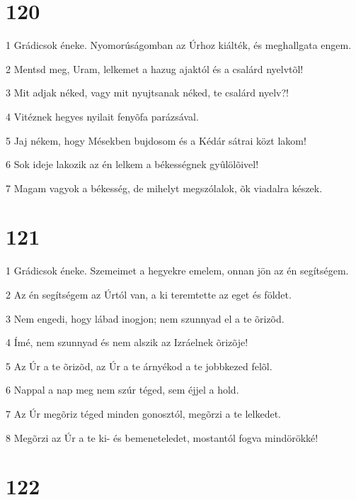 \chapter{120}

\par 1 Grádicsok éneke. Nyomorúságomban az Úrhoz kiálték, és meghallgata engem.
\par 2 Mentsd meg, Uram, lelkemet a hazug ajaktól és a csalárd nyelvtõl!
\par 3 Mit adjak néked, vagy mit nyujtsanak néked, te csalárd nyelv?!
\par 4 Vitéznek hegyes nyilait fenyõfa parázsával.
\par 5 Jaj nékem, hogy Mésekben bujdosom és a Kédár sátrai közt lakom!
\par 6 Sok ideje lakozik az én lelkem a békességnek gyûlölõivel!
\par 7 Magam vagyok a békesség, de mihelyt megszólalok, õk viadalra készek.

\chapter{121}

\par 1 Grádicsok éneke. Szemeimet a hegyekre emelem, onnan jön az én segítségem.
\par 2 Az én segítségem az Úrtól van, a ki teremtette az eget és földet.
\par 3 Nem engedi, hogy lábad inogjon; nem szunnyad el a te õrizõd.
\par 4 Ímé, nem szunnyad és nem alszik az Izráelnek õrizõje!
\par 5 Az Úr a te õrizõd, az Úr a te árnyékod a te jobbkezed felõl.
\par 6 Nappal a nap meg nem szúr téged, sem éjjel a hold.
\par 7 Az Úr megõriz téged minden gonosztól, megõrzi a te lelkedet.
\par 8 Megõrzi az Úr a te ki- és bemeneteledet, mostantól fogva mindörökké!

\chapter{122}

